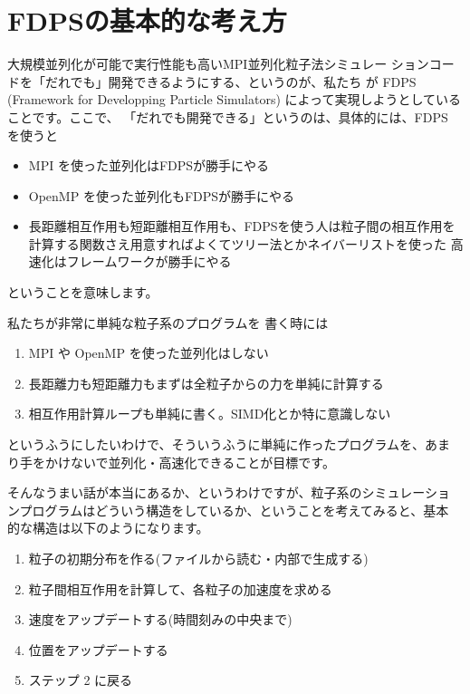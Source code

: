
\section{FDPSの基本的な考え方}

大規模並列化が可能で実行性能も高いMPI並列化粒子法シミュレー
ションコードを「だれでも」開発できるようにする、というのが、私たち
が FDPS (Framework for Developping Particle
Simulators) によって実現しようとしていることです。ここで、
「だれでも開発できる」というのは、具体的には、FDPS を使うと

\begin{itemize}

\item MPI を使った並列化はFDPSが勝手にやる
\item OpenMP を使った並列化もFDPSが勝手にやる
\item 長距離相互作用も短距離相互作用も、FDPSを使う人は粒子間の相互作用を
  計算する関数さえ用意すればよくてツリー法とかネイバーリストを使った
  高速化はフレームワークが勝手にやる

\end{itemize}
ということを意味します。

私たちが非常に単純な粒子系のプログラムを
書く時には

\begin{enumerate}

\item MPI や OpenMP を使った並列化はしない
\item 長距離力も短距離力もまずは全粒子からの力を単純に計算する
\item 相互作用計算ループも単純に書く。SIMD化とか特に意識しない

\end{enumerate}
というふうにしたいわけで、そういうふうに単純に作ったプログラムを、あま
り手をかけないで並列化・高速化できることが目標です。

そんなうまい話が本当にあるか、というわけですが、粒子系のシミュレーショ
ンプログラムはどういう構造をしているか、ということを考えてみると、基本
的な構造は以下のようになります。

\begin{enumerate}

\item 粒子の初期分布を作る(ファイルから読む・内部で生成する)
\item 粒子間相互作用を計算して、各粒子の加速度を求める
\item 速度をアップデートする(時間刻みの中央まで)
\item 位置をアップデートする  
\item ステップ 2 に戻る
\end{enumerate}  

